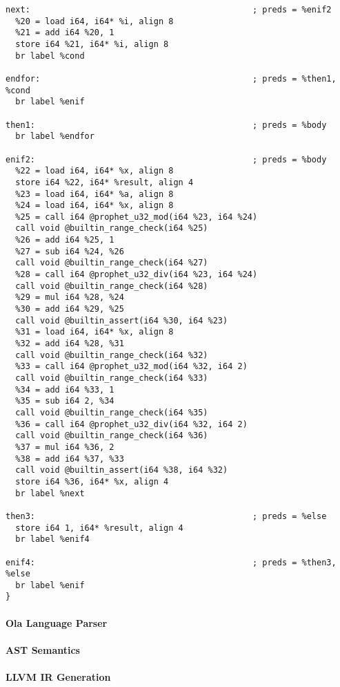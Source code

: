 \begin{lstlisting}[language={}]
next:                                             ; preds = %enif2
  %20 = load i64, i64* %i, align 8
  %21 = add i64 %20, 1
  store i64 %21, i64* %i, align 8
  br label %cond

endfor:                                           ; preds = %then1, %cond
  br label %enif

then1:                                            ; preds = %body
  br label %endfor

enif2:                                            ; preds = %body
  %22 = load i64, i64* %x, align 8
  store i64 %22, i64* %result, align 4
  %23 = load i64, i64* %a, align 8
  %24 = load i64, i64* %x, align 8
  %25 = call i64 @prophet_u32_mod(i64 %23, i64 %24)
  call void @builtin_range_check(i64 %25)
  %26 = add i64 %25, 1
  %27 = sub i64 %24, %26
  call void @builtin_range_check(i64 %27)
  %28 = call i64 @prophet_u32_div(i64 %23, i64 %24)
  call void @builtin_range_check(i64 %28)
  %29 = mul i64 %28, %24
  %30 = add i64 %29, %25
  call void @builtin_assert(i64 %30, i64 %23)
  %31 = load i64, i64* %x, align 8
  %32 = add i64 %28, %31
  call void @builtin_range_check(i64 %32)
  %33 = call i64 @prophet_u32_mod(i64 %32, i64 2)
  call void @builtin_range_check(i64 %33)
  %34 = add i64 %33, 1
  %35 = sub i64 2, %34
  call void @builtin_range_check(i64 %35)
  %36 = call i64 @prophet_u32_div(i64 %32, i64 2)
  call void @builtin_range_check(i64 %36)
  %37 = mul i64 %36, 2
  %38 = add i64 %37, %33
  call void @builtin_assert(i64 %38, i64 %32)
  store i64 %36, i64* %x, align 4
  br label %next

then3:                                            ; preds = %else
  store i64 1, i64* %result, align 4
  br label %enif4

enif4:                                            ; preds = %then3, %else
  br label %enif
}
\end{lstlisting}

\paragraph{Ola Language Parser}

\paragraph{AST Semantics}

\paragraph{LLVM IR Generation}
